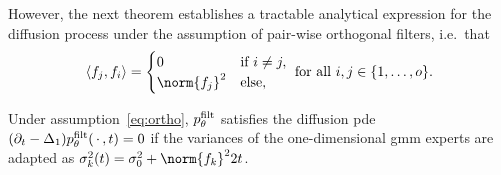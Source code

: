 However, the next theorem establishes a tractable analytical expression for the diffusion process under the assumption of pair-wise orthogonal filters, i.e.\ that
\begin{equation}
	\langle \Filter_j, \Filter_i \rangle = \begin{cases}
		\num{0} & \text{if}\ i \neq j, \\
		\norm{\Filter_j}^{\num{2}} & \text{else},
	\end{cases}\ \text{for all}\ i, j \in \{ \num{1}, \dotsc, \NumExperts \}.
\label{eq:ortho}
\end{equation}
\begin{theorem}
	Under assumption~\eqref{eq:ortho}, \( p^{\mathrm{filt}}_\theta \) satisfies the diffusion \gls{pde} \( (\partial_t - \Delta_{\num{1}}) p^{\mathrm{filt}}_\theta(\,\cdot\,, t) = \num{0} \) if the variances of the one-dimensional \gls{gmm} experts are adapted as \( \sigma_k^{\num{2}}(t) = \sigma_{\num{0}}^{\num{2}} + \norm{\Filter_k}^{\num{2}} \num{2}t \).
	\label{th:diff local}
\end{theorem}
